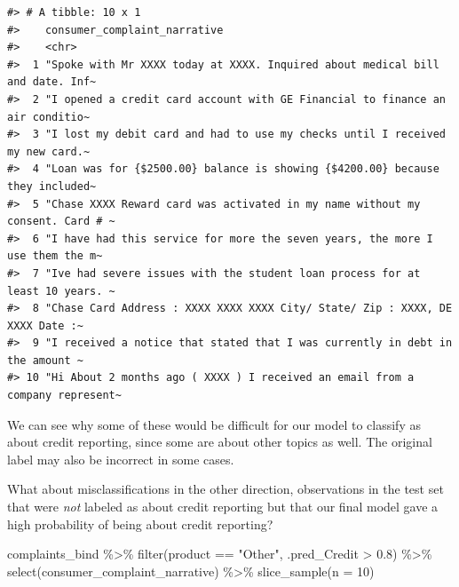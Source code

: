 \documentclass[
]{krantz}
\makeatletter
\newenvironment{Shaded}{\begin{snugshade}}{\end{snugshade}}
\newcommand{\AttributeTok}[1]{\textcolor[rgb]{0.77,0.63,0.00}{#1}}
\newcommand{\DecValTok}[1]{\textcolor[rgb]{0.00,0.00,0.81}{#1}}
\newcommand{\FloatTok}[1]{\textcolor[rgb]{0.00,0.00,0.81}{#1}}
\newcommand{\FunctionTok}[1]{\textcolor[rgb]{0.00,0.00,0.00}{#1}}
\newcommand{\NormalTok}[1]{#1}
\newcommand{\SpecialCharTok}[1]{\textcolor[rgb]{0.00,0.00,0.00}{#1}}
\newcommand{\StringTok}[1]{\textcolor[rgb]{0.31,0.60,0.02}{#1}}
\newenvironment{kframe}{%
\medskip{}
\setlength{\fboxsep}{.8em}
 \def\at@end@of@kframe{}%
 \ifinner\ifhmode%
  \def\at@end@of@kframe{\end{minipage}}%
  \begin{minipage}{\columnwidth}%
 \fi\fi%
 \def\FrameCommand##1{\hskip\@totalleftmargin \hskip-\fboxsep
 \colorbox{shadecolor}{##1}\hskip-\fboxsep
     \hskip-\linewidth \hskip-\@totalleftmargin \hskip\columnwidth}%
 \MakeFramed {\advance\hsize-\width
   \@totalleftmargin\z@ \linewidth\hsize
   \@setminipage}}%
 {\par\unskip\endMakeFramed%
 \at@end@of@kframe}
\renewenvironment{Shaded}{\begin{kframe}}{\end{kframe}}
\makeatother
\begin{document}
\begin{verbatim}
#> # A tibble: 10 x 1
#>    consumer_complaint_narrative                                                 
#>    <chr>                                                                        
#>  1 "Spoke with Mr XXXX today at XXXX. Inquired about medical bill and date. Inf~
#>  2 "I opened a credit card account with GE Financial to finance an air conditio~
#>  3 "I lost my debit card and had to use my checks until I received my new card.~
#>  4 "Loan was for {$2500.00} balance is showing {$4200.00} because they included~
#>  5 "Chase XXXX Reward card was activated in my name without my consent. Card # ~
#>  6 "I have had this service for more the seven years, the more I use them the m~
#>  7 "Ive had severe issues with the student loan process for at least 10 years. ~
#>  8 "Chase Card Address : XXXX XXXX XXXX City/ State/ Zip : XXXX, DE XXXX Date :~
#>  9 "I received a notice that stated that I was currently in debt in the amount ~
#> 10 "Hi About 2 months ago ( XXXX ) I received an email from a company represent~
\end{verbatim}

We can see why some of these would be difficult for our model to classify as about credit reporting, since some are about other topics as well. The original label may also be incorrect in some cases.

What about misclassifications in the other direction, observations in the test set that were \emph{not} labeled as about credit reporting but that our final model gave a high probability of being about credit reporting?

\begin{Shaded}
\begin{Highlighting}[]
\NormalTok{complaints\_bind }\SpecialCharTok{\%\textgreater{}\%}
  \FunctionTok{filter}\NormalTok{(product }\SpecialCharTok{==} \StringTok{"Other"}\NormalTok{, .pred\_Credit }\SpecialCharTok{\textgreater{}} \FloatTok{0.8}\NormalTok{) }\SpecialCharTok{\%\textgreater{}\%}
  \FunctionTok{select}\NormalTok{(consumer\_complaint\_narrative) }\SpecialCharTok{\%\textgreater{}\%}
  \FunctionTok{slice\_sample}\NormalTok{(}\AttributeTok{n =} \DecValTok{10}\NormalTok{)}
\end{Highlighting}
\end{Shaded}
\end{document}
